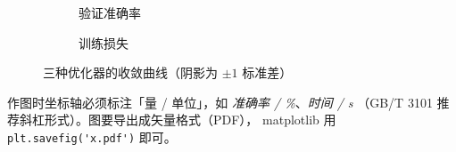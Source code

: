 \begin{figure}[htbp]
  \centering
  \begin{subfigure}[b]{0.47\linewidth}
    \centering
    \caption{验证准确率}
    \label{fig:curve-acc}
  \end{subfigure}
  \hfill
  \begin{subfigure}[b]{0.47\linewidth}
    \centering
    \caption{训练损失}
    \label{fig:curve-loss}
  \end{subfigure}
  \caption{三种优化器的收敛曲线（阴影为 $\pm 1$ 标准差）}
  \label{fig:curve}
\end{figure}

\begin{caution}
  作图时坐标轴必须标注「量 / 单位」，如 \emph{准确率 / \%}、\emph{时间 / s}
  （GB/T 3101 推荐斜杠形式）。图要导出成矢量格式（PDF），
  matplotlib 用 \lstinline|plt.savefig('x.pdf')| 即可。
\end{caution}
